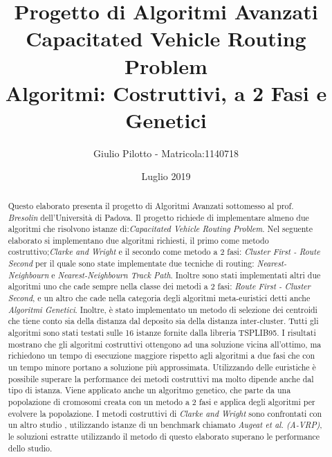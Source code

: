 \documentclass[]{article}
\title{Progetto di Algoritmi Avanzati  	
		\\ \large Capacitated Vehicle Routing Problem 
		 \\  Algoritmi: Costruttivi, a 2 Fasi e Genetici}
\author{Giulio Pilotto - Matricola:1140718}
\date{Luglio 2019}
\begin{document}
	



\maketitle


\begin{abstract}

Questo elaborato presenta il progetto di Algoritmi Avanzati sottomesso al prof. \textit{Bresolin} dell'Università di Padova.
Il progetto richiede di implementare almeno due algoritmi che risolvono istanze di:\textit{Capacitated Vehicle Routing Problem}.
Nel seguente elaborato si implementano due algoritmi richiesti, il primo come metodo costruttivo;\textit{Clarke and Wright} e il secondo come metodo a 2 fasi: \textit{Cluster First - Route Second} per il quale sono state implementate due tecniche di routing: \textit{Nearest-Neighbourn} e \textit{Nearest-Neighbourn Track Path}.
Inoltre sono  stati implementati altri due algoritmi uno che cade sempre nella classe dei metodi a 2 fasi: \textit{Route First - Cluster Second}, e un altro che cade nella categoria degli algoritmi meta-euristici detti anche \textit{Algoritmi Genetici}.
Inoltre, è stato implementato un metodo di selezione dei centroidi che tiene conto sia della distanza dal deposito sia della distanza inter-cluster.
Tutti gli algoritmi sono stati testati sulle 16 istanze fornite dalla libreria TSPLIB95.
I risultati mostrano che gli algoritmi costruttivi ottengono ad una soluzione vicina all'ottimo, ma richiedono un tempo di esecuzione maggiore rispetto agli algoritmi a due fasi che con un tempo minore portano a soluzione più approssimata.
Utilizzando delle euristiche è possibile superare la performance dei metodi costruttivi ma molto dipende anche dal tipo di istanza.
Viene applicato anche un algoritmo genetico, che parte da una popolazione di cromosomi creata con un metodo a 2 fasi e applica degli algoritmi per evolvere la popolazione.
I metodi costruttivi di \textit{ Clarke and Wright} sono confrontati con un altro studio \cite{studio}, utilizzando istanze di un benchmark chiamato \textit{Augeat et al.}  \emph{(A-VRP)}, le soluzioni estratte utilizzando il metodo di questo elaborato superano le performance dello studio.

\end{abstract}
\end{document}
